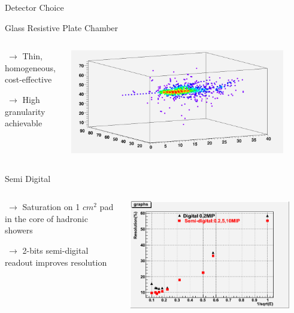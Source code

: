 \documentclass[10pt]{beamer}
\begin{document}
\begin{frame}{Detector Choice}

  \begin{block}{Glass Resistive Plate Chamber}
    \begin{columns}
      \begin{column}{0.5\textwidth}
        {
   	  \par $ ~ \rightarrow$ Thin, homogeneous, cost-effective
          \par $ ~ \rightarrow$ High granularity achievable
        }   
      \end{column}
      \begin{column}{0.5\textwidth}
        \centerline{\includegraphics[width=0.9\textwidth]{images/ShowerExample}}
      \end{column}
    \end{columns}
  \end{block}
  
  \pause   

  \begin{block}{  Semi Digital}
    \begin{columns}
      \begin{column}{0.5\textwidth}
        {
          \par $ ~ \rightarrow$ Saturation on 1 $cm^2$ pad in the core of hadronic showers 
          \par $ ~\rightarrow$ 2-bits semi-digital readout improves resolution
        }
      \end{column}

      \begin{column}{0.5\textwidth}
        \centerline{\includegraphics[width=0.9\textwidth]{images/DigitalSemiDigital}}
      \end{column}
    \end{columns}


\end{block}
\end{frame}
\end{document}
